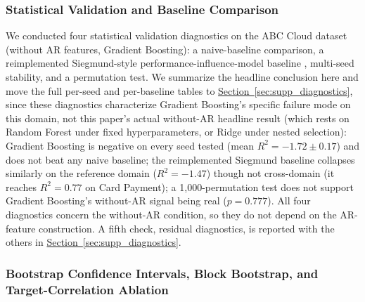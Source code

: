 \documentclass[technologies,article,submit,pdftex,moreauthors]{Definitions/mdpi}
\begin{document}
\subsubsection{Statistical Validation and Baseline Comparison}\label{sec:statistical_validation}

We conducted four statistical validation diagnostics on the ABC Cloud dataset (without AR features, Gradient Boosting): a naive-baseline comparison, a reimplemented Siegmund-style performance-influence-model baseline \citep{siegmund2015}, multi-seed stability, and a permutation test. We summarize the headline conclusion here and move the full per-seed and per-baseline tables to \hyperref[sec:supp_diagnostics]{Section~\ref*{sec:supp_diagnostics}}, since these diagnostics characterize Gradient Boosting's specific failure mode on this domain, not this paper's actual without-AR headline result (which rests on Random Forest under fixed hyperparameters, or Ridge under nested selection): Gradient Boosting is negative on every seed tested (mean \(R^2=-1.72\pm0.17\)) and does not beat any naive baseline; the reimplemented Siegmund baseline collapses similarly on the reference domain (\(R^2=-1.47\)) though not cross-domain (it reaches \(R^2=0.77\) on Card Payment); a 1,000-permutation test does not support Gradient Boosting's without-AR signal being real (\(p=0.777\)). All four diagnostics concern the without-AR condition, so they do not depend on the AR-feature construction. A fifth check, residual diagnostics, is reported with the others in \hyperref[sec:supp_diagnostics]{Section~\ref*{sec:supp_diagnostics}}.

\subsubsection{Bootstrap Confidence Intervals, Block Bootstrap, and Target-Correlation Ablation}\label{sec:bootstrap_ablation}
\end{document}
